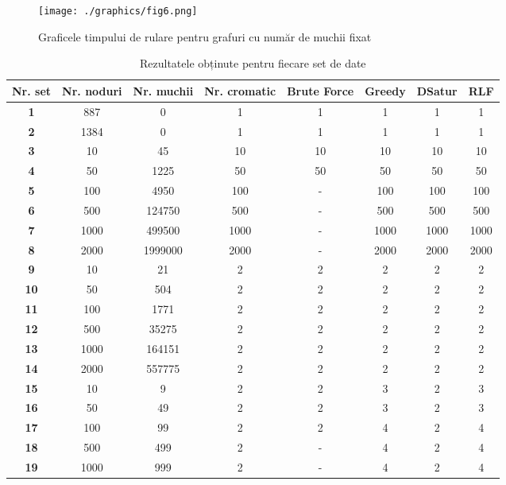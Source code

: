 \documentclass[runningheads]{paper}
\begin{document}
\begin{figure}[!]
\centering
\texttt{[image: ./graphics/fig6.png]}
\caption{Graficele timpului de rulare pentru grafuri cu număr de muchii fixat}
\label{fig:fixed_edge_number_graphs}
\end{figure}

\begin{table}[!]
\centering
\caption{Rezultatele obținute pentru fiecare set de date}
\label{tab:results}
\begin{tabular}{|c|c|c|c|c|c|c|c|}
\hline
\textbf{Nr. set} & \textbf{Nr. noduri} & \textbf{Nr. muchii} & \textbf{Nr. cromatic} & \textbf{Brute Force} & \textbf{Greedy} & \textbf{DSatur} & \textbf{RLF} \\ \hline
\textbf{1} & 887 & 0 & 1 & 1 & 1 & 1 & 1 \\ \hline 
\textbf{2} & 1384 & 0 & 1 & 1 & 1 & 1 & 1 \\ \hline
\textbf{3} & 10 & 45 & 10 & 10 & 10 & 10 & 10 \\ \hline 
\textbf{4} & 50 & 1225 & 50 & 50 & 50 & 50 & 50 \\ \hline 
\textbf{5} & 100 & 4950 & 100 & - & 100 & 100 & 100 \\ \hline 
\textbf{6} & 500 & 124750 & 500 & - & 500 & 500 & 500 \\ \hline 
\textbf{7} & 1000 & 499500 & 1000 & - & 1000 & 1000 & 1000 \\ \hline 
\textbf{8} & 2000 & 1999000 & 2000 & - & 2000 & 2000 & 2000 \\ \hline 
\textbf{9} & 10 & 21 & 2 & 2 & 2 & 2 & 2 \\ \hline 
\textbf{10} & 50 & 504 & 2 & 2 & 2 & 2 & 2 \\ \hline 
\textbf{11} & 100 & 1771 & 2 & 2 & 2 & 2 & 2 \\ \hline 
\textbf{12} & 500 & 35275 & 2 & 2 & 2 & 2 & 2 \\ \hline 
\textbf{13} & 1000 & 164151 & 2 & 2 & 2 & 2 & 2 \\ \hline 
\textbf{14} & 2000 & 557775 & 2 & 2 & 2 & 2 & 2 \\ \hline 
\textbf{15} & 10 & 9 & 2 & 2 & 3 & 2 & 3 \\ \hline 
\textbf{16} & 50 & 49 & 2 & 2 & 3 & 2 & 3 \\ \hline 
\textbf{17} & 100 & 99 & 2 & 2 & 4 & 2 & 4 \\ \hline 
\textbf{18} & 500 & 499 & 2 & - & 4 & 2 & 4 \\ \hline 
\textbf{19} & 1000 & 999 & 2 & - & 4 & 2 & 4 \\ \hline 

\end{tabular}
\end{table}
\end{document}
